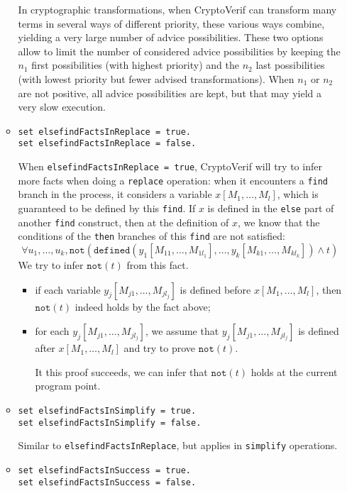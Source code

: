 \begin{itemize}
\begin{itemize}
In cryptographic transformations, when CryptoVerif can transform many terms in several ways of different priority, these various ways combine, yielding a very large number of advice possibilities. These two options allow to limit the number of considered advice possibilities by keeping the $n_1$ first possibilities (with highest priority) and the $n_2$ last possibilities (with lowest priority but fewer advised transformations). When $n_1$ or $n_2$ are not positive, all advice possibilities are kept, but that may yield a very slow execution. 

\item \texttt{set elsefindFactsInReplace = true.}\\
\texttt{set elsefindFactsInReplace = false.}

When \texttt{elsefindFactsInReplace = true}, CryptoVerif will try to
infer more facts when doing a \texttt{replace} operation: when it
encounters a \texttt{find} branch in the process, it considers a
variable $x[M_1, \ldots, M_l]$, which is guaranteed to be defined by this \texttt{find}.
If $x$ is defined in the \texttt{else} part of another \texttt{find}
construct, then at the definition of $x$, we know that the conditions
of the \texttt{then} branches of this \texttt{find} are not satisfied:
\[\forall u_1, \ldots, u_k, \texttt{not}(\texttt{defined}(y_1[M_{11}, \ldots, M_{1l_1}], \ldots, y_k[M_{k1}, \ldots, M_{kl_k}]) \wedge t)\]
We try to infer $\texttt{not}(t)$ from this fact.
\begin{itemize}
\item if each variable $y_j[M_{j1}, \ldots, M_{jl_j}]$ is defined before $x[M_1, \ldots, M_l]$,
then $\texttt{not}(t)$ indeed holds by the fact above;
\item for each $y_j[M_{j1}, \ldots, M_{jl_j}]$, 
we assume that $y_j[M_{j1}, \ldots, M_{jl_j}]$ is defined after $x[M_1, \ldots, M_l]$
and try to prove $\texttt{not}(t)$.

It this proof succeeds, we can infer that $\texttt{not}(t)$ holds
at the current program point.
\end{itemize}

\item \texttt{set elsefindFactsInSimplify = true.}\\
\texttt{set elsefindFactsInSimplify = false.}

Similar to \texttt{elsefindFactsInReplace}, but applies in
\texttt{simplify} operations. 

\item \texttt{set elsefindFactsInSuccess = true.}\\
\texttt{set elsefindFactsInSuccess = false.}


\end{itemize}
\end{itemize}

